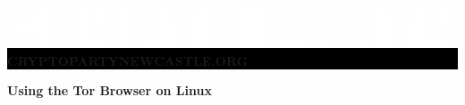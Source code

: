 \documentclass[10.5pt,a4paper]{article} %
\begin{document}

\begin{center}
	\vspace{1cm}
	\colorbox{Black}{
		\begin{minipage}{18.5cm}
			\begin{center}
			\color{white}
			\vspace{0.3cm}
	             \includegraphics[width=1\textwidth]{organisationlogo.eps} %
	        \\[10pt]
			     \textbf{{\LARGE CRYPTOPARTYNEWCASTLE.ORG}} %
			\vspace{0.3cm}
			\end{center}
		\end{minipage}
	}
\end{center}


\begin{center}
\vspace{0.5cm}
\textbf{{\LARGE Using the Tor Browser on Linux} %
\vspace{0.5cm}
}\end{center}
\end{document}
